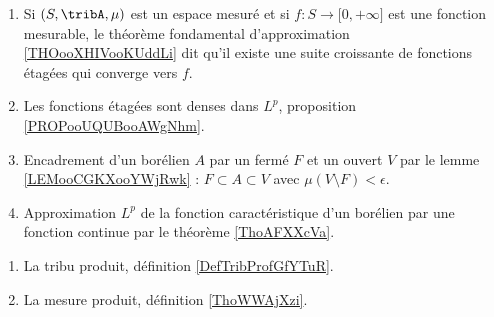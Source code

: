\begin{description}
	      \begin{enumerate}
		      \item
		            Si \( (S,\tribA, \mu)\) est un espace mesuré et si \( f\colon S\to \mathopen[ 0 , +\infty \mathclose]\) est une fonction mesurable, le théorème fondamental d'approximation \ref{THOooXHIVooKUddLi} dit qu'il existe une suite croissante de fonctions étagées qui converge vers \( f\).
		      \item
		            Les fonctions étagées sont denses dans \( L^p\), proposition \ref{PROPooUQUBooAWgNhm}.
		      \item
		            Encadrement d'un borélien \( A\) par un fermé \( F\) et un ouvert \( V\) par le lemme \ref{LEMooCGKXooYWjRwk} : \( F\subset A\subset V\) avec \( \mu(V\setminus F)<\epsilon\).
		      \item
		            Approximation \( L^p\) de la fonction caractéristique d'un borélien par une fonction continue par le théorème \ref{ThoAFXXcVa}.
	      \end{enumerate}
	\item[Produit]
	      \begin{enumerate}
		      \item
		            La tribu produit, définition \ref{DefTribProfGfYTuR}.
		      \item
		            La mesure produit, définition \ref{ThoWWAjXzi}.
	      \end{enumerate}
\end{description}

